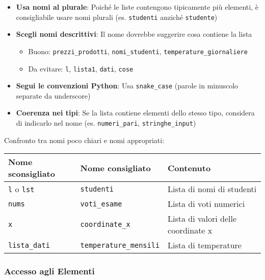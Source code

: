 \begin{tcolorbox}[colback=green!5!white,colframe=green!75!black,title=Best practice per i nomi delle liste]
\begin{itemize}
    \item \textbf{Usa nomi al plurale}: Poiché le liste contengono tipicamente più elementi, è consigliabile usare nomi plurali (es. \texttt{studenti} anziché \texttt{studente})
    
    \item \textbf{Scegli nomi descrittivi}: Il nome dovrebbe suggerire cosa contiene la lista
    \begin{itemize}
        \item Buono: \texttt{prezzi\_prodotti}, \texttt{nomi\_studenti}, \texttt{temperature\_giornaliere}
        \item Da evitare: \texttt{l}, \texttt{lista1}, \texttt{dati}, \texttt{cose}
    \end{itemize}
    
    \item \textbf{Segui le convenzioni Python}: Usa \texttt{snake\_case} (parole in minuscolo separate da underscore)
    
    \item \textbf{Coerenza nei tipi}: Se la lista contiene elementi dello stesso tipo, considera di indicarlo nel nome (es. \texttt{numeri\_pari}, \texttt{stringhe\_input})
\end{itemize}
\end{tcolorbox}

\begin{esempio}
Confronto tra nomi poco chiari e nomi appropriati:

\begin{tabular}{|l|l|l|}
\hline
\textbf{Nome sconsigliato} & \textbf{Nome consigliato} & \textbf{Contenuto} \\
\hline
\texttt{l} o \texttt{lst} & \texttt{studenti} & Lista di nomi di studenti \\
\texttt{nums} & \texttt{voti\_esame} & Lista di voti numerici \\
\texttt{x} & \texttt{coordinate\_x} & Lista di valori delle coordinate x \\
\texttt{lista\_dati} & \texttt{temperature\_mensili} & Lista di temperature \\
\hline
\end{tabular}
\end{esempio}

\subsubsection{Accesso agli Elementi}\label{AccessoListe}

